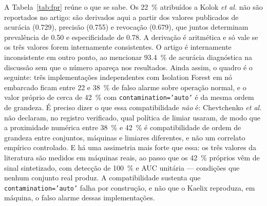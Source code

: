 \documentclass[11pt,a4paper]{article}
\begin{document}
A Tabela~\ref{tab:fpr} reúne o que se sabe. Os \SI{22}{\percent} atribuídos a
Kolok \emph{et al.} não são reportados no artigo: são derivados aqui a partir dos
valores publicados de acurácia (\num{0,729}), precisão (\num{0,755}) e revocação
(\num{0,679}), que juntos determinam prevalência de \num{0,50} e especificidade de
\num{0,78}. A derivação é aritmética e só vale se os três valores forem internamente
consistentes. O artigo é internamente inconsistente em outro ponto, ao mencionar
\SI{93,4}{\percent} de acurácia diagnóstica na discussão sem que o número apareça nos
resultados. Ainda assim, o quadro é o seguinte: três implementações independentes com
Isolation Forest em nó embarcado ficam entre \num{22} e \SI{38}{\percent} de falso alarme
sobre operação normal, e o valor próprio de cerca de \SI{42}{\percent} com
\texttt{contamination='auto'} é da mesma ordem de grandeza. É preciso dizer o que essa
compatibilidade \emph{não} é: Chevtchenko \emph{et al.} não declaram, no registro
verificado, qual política de limiar usaram, de modo que a proximidade numérica entre
\SI{38}{\percent} e \SI{42}{\percent} é compatibilidade de ordem de grandeza entre
conjuntos, máquinas e limiares diferentes, e não um correlato empírico controlado. E há
uma assimetria mais forte que essa: os três valores da literatura são medidos em máquinas
reais, ao passo que os \SI{42}{\percent} próprios vêm de sinal sintetizado, com detecção
de \SI{100}{\percent} e AUC unitária --- condições que nenhum conjunto real produz. A
compatibilidade sustenta que \texttt{contamination='auto'} falha por construção, e não
que o Kaelix reproduza, em máquina, o falso alarme dessas implementações.
\end{document}
